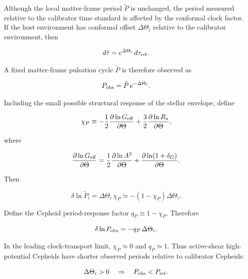 \documentclass[
]{article}
\begin{document}
Although the local matter-frame period \(\tilde P\) is unchanged, the
period measured relative to the calibrator time standard is affected by
the conformal clock factor. If the host environment has conformal offset
\(\Delta\Theta_i\) relative to the calibrator environment, then

\begin{equation}
d\tilde\tau = e^{\Delta\Theta_i}\,d\tau_{\rm ref} .
\end{equation}

A fixed matter-frame pulsation cycle \(\tilde P\) is therefore observed
as

\begin{equation}
P_{\rm obs} = \tilde P\,e^{-\Delta\Theta_i} .
\end{equation}

Including the small possible structural response of the stellar
envelope, define

\begin{equation}
\chi_P \equiv -\frac{1}{2}\frac{\partial\ln G_{\rm eff}}{\partial\Theta} + \frac{3}{2}\frac{\partial\ln R_\star}{\partial\Theta} ,
\end{equation}

where

\begin{equation}
\frac{\partial\ln G_{\rm eff}}{\partial\Theta} = \frac{1}{2}\frac{\partial\ln A^2}{\partial\Theta} + \frac{\partial\ln(1 + \delta_G)}{\partial\Theta} .
\end{equation}

Then

\begin{equation}
\delta\ln\tilde P_i = \Delta\Theta_i\,\chi_P \simeq -(1 - \chi_P)\Delta\Theta_i .
\end{equation}

Define the Cepheid period-response factor \(q_P \equiv 1 - \chi_P\).
Therefore

\begin{equation}
\delta\ln P_{\rm obs} = -q_P\,\Delta\Theta_i .
\end{equation}

In the leading clock-transport limit, \(\chi_P \simeq 0\) and
\(q_P \simeq 1\). Thus active-shear high-potential Cepheids have shorter
observed periods relative to calibrator Cepheids:

\begin{equation}
\Delta\Theta_i > 0 \quad\Rightarrow\quad P_{\rm obs} < P_{\rm ref} .
\end{equation}
\end{document}
